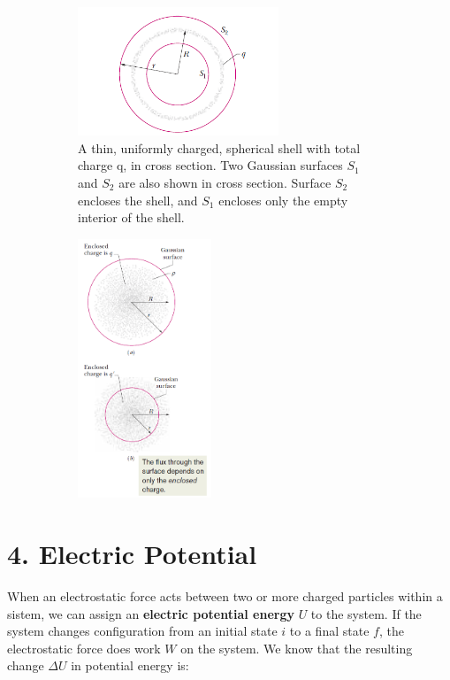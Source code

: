 \documentclass[12pt, a4paper]{article}
\begin{document}
		\begin{figure}[h]
			\centering
			\begin{subfigure}{0.45\textwidth} %
				\centering
				\includegraphics[width=6cm]{Physics2_PNGs/shell-theorem.png} %
				\caption*{A thin, uniformly charged,
					spherical shell with total charge q, in cross
					section. Two Gaussian surfaces $S_1$ and $S_2$
					are also shown in cross section. Surface $S_2$
					encloses the shell, and $S_1$ encloses only the
					empty interior of the shell.}
				\label{fig:shell-theorem.png}
			\end{subfigure}
			\hfill
			\begin{subfigure}{0.45\textwidth} %
				\centering
				\includegraphics[width=4cm]{Physics2_PNGs/gauss-spherical-symm.png} 
				\caption*{}
				\label{fig:gauss-spherical-symm.png}
			\end{subfigure}
			\caption*{}
			\label{fig:both}
		\end{figure}
		\newpage
		
		
		
		
		\section*{4. Electric Potential}
		
		When an electrostatic force acts between two or more charged particles within a sistem, we can assign an \textbf{electric potential energy} $U$ to the system. If the system changes configuration from an initial state $i$ to a final state $f$, the electrostatic force does work $W$ on the system. We know that the resulting change $\Delta U$ in potential energy is:
	
\end{document}
